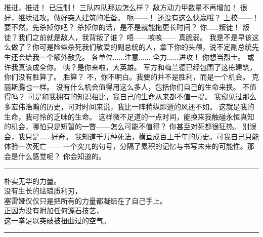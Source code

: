 \documentclass[openany]{book}
\begin{document}
\begin{dialogue}
     推进，推进！
     已压制！
     三队四队那边怎么样？
     敌方动力甲数量不再增加！
     很好，继续进攻。做好突入建筑的准备。
     呃——！
     还没有这么快赢哦？
     上校——！
     要不然，先杀掉你吧？
     杀掉你的话，是不是就能拖更长时间？
     你......叛徒！
     叛徒？我们之前就是敌人，我背叛了谁？
     唔——咳咳——
     真脆弱。
     我是不是早该这么做了？你可是险些杀死我们敬爱的副总统的人，拿下你的头颅，说不定副总统先生还会给我一个额外赦免。
     各单位......注意......
     全力......进攻！
     你想当烈士。
     或许我真该成全你。
     咦？是你来啦，大英雄。
     军方和梅兰德已经包围了这栋建筑，你们没有胜算了。
     胜算？
     不，你不明白。我要的并不是胜利，而是一个机会。
     克丽斯腾也一样。
     没有什么机会值得用这么多人，包括你们自己的生命来换。
     不值得吗？
     可是和我拥有的知识相比，我自己的生命从来都不值一提。
     我窥见过那么多宏伟浩瀚的历史，可对时间来说，我比一阵稍纵即逝的风还不如。
     这就是我的生命，我可怜的乏味的生命。
     这样微不足道的一点时间，能换来我触碰永恒真知的机会，哪怕只是短暂的一瞥——怎么可能不值得？
     你甚至对死都很狂热。
     别误会，我只是......好奇。
     我知道千万种死法，横亘成百上千年的历史。可我自己只能体验一次死亡——
     一个突兀的句号，分隔了累积的记忆与书写未来的可能性。那会是什么感觉呢？
     你会知道的。
    \par\noindent\rule{\textwidth}{0.4pt}\par
    朴实无华的力量。\\
    没有生长的珐琅质利刃，\\
    塞雷娅仅仅只是把所有的力量都凝结在了自己手上。\\
    正因为没有附加任何源石技艺，\\
    这一拳足以突破被扭曲过的空气。
    \par\noindent\rule{\textwidth}{0.4pt}
\end{dialogue}
\end{document}
